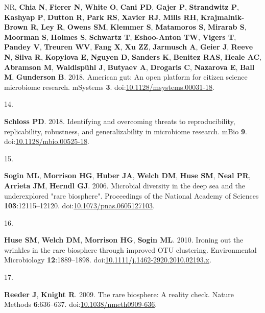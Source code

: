 \documentclass[
]{article}
\newlength{\cslhangindent}
\newlength{\csllabelwidth}
\newlength{\cslentryspacingunit} %
\newenvironment{CSLReferences}[2] %
 {%
  \setlength{\parindent}{0pt}
  \ifodd #1
  \let\oldpar\par
  \def\par{\hangindent=\cslhangindent\oldpar}
  \fi
  \setlength{\parskip}{#2\cslentryspacingunit}
 }%
 {}
\newcommand{\CSLLeftMargin}[1]{\parbox[t]{\csllabelwidth}{#1}}
\newcommand{\CSLRightInline}[1]{\parbox[t]{\linewidth - \csllabelwidth}{#1}\break}
\begin{document}
\begin{CSLReferences}{0}{1}
{{NR}, \textbf{Chia N}, \textbf{Fierer N}, \textbf{White O}, \textbf{Cani
PD}, \textbf{Gajer P}, \textbf{Strandwitz P}, \textbf{Kashyap P},
\textbf{Dutton R}, \textbf{Park RS}, \textbf{Xavier RJ}, \textbf{Mills
RH}, \textbf{Krajmalnik-Brown R}, \textbf{Ley R}, \textbf{Owens SM},
\textbf{Klemmer S}, \textbf{Matamoros S}, \textbf{Mirarab S},
\textbf{Moorman S}, \textbf{Holmes S}, \textbf{Schwartz T},
\textbf{Eshoo-Anton TW}, \textbf{Vigers T}, \textbf{Pandey V},
\textbf{Treuren WV}, \textbf{Fang X}, \textbf{Xu ZZ}, \textbf{Jarmusch
A}, \textbf{Geier J}, \textbf{Reeve N}, \textbf{Silva R},
\textbf{Kopylova E}, \textbf{Nguyen D}, \textbf{Sanders K},
\textbf{Benitez RAS}, \textbf{Heale AC}, \textbf{Abramson M},
\textbf{Waldispühl J}, \textbf{Butyaev A}, \textbf{Drogaris C},
\textbf{Nazarova E}, \textbf{Ball M}, \textbf{Gunderson B}. 2018.
American gut: An open platform for citizen science microbiome research.
{mSystems} \textbf{3}.
doi:\href{https://doi.org/10.1128/msystems.00031-18}{10.1128/msystems.00031-18}.}

\leavevmode{}%
\CSLLeftMargin{14. }%
\CSLRightInline{\textbf{Schloss PD}. 2018. Identifying and overcoming
threats to reproducibility, replicability, robustness, and
generalizability in microbiome research. {mBio} \textbf{9}.
doi:\href{https://doi.org/10.1128/mbio.00525-18}{10.1128/mbio.00525-18}.}

\leavevmode{}%
\CSLLeftMargin{15. }%
\CSLRightInline{\textbf{Sogin ML}, \textbf{Morrison HG}, \textbf{Huber
JA}, \textbf{Welch DM}, \textbf{Huse SM}, \textbf{Neal PR},
\textbf{Arrieta JM}, \textbf{Herndl GJ}. 2006. Microbial diversity in
the deep sea and the underexplored "rare biosphere". Proceedings of the
National Academy of Sciences \textbf{103}:12115--12120.
doi:\href{https://doi.org/10.1073/pnas.0605127103}{10.1073/pnas.0605127103}.}

\leavevmode{}%
\CSLLeftMargin{16. }%
\CSLRightInline{\textbf{Huse SM}, \textbf{Welch DM}, \textbf{Morrison
HG}, \textbf{Sogin ML}. 2010. Ironing out the wrinkles in the rare
biosphere through improved {OTU} clustering. Environmental Microbiology
\textbf{12}:1889--1898.
doi:\href{https://doi.org/10.1111/j.1462-2920.2010.02193.x}{10.1111/j.1462-2920.2010.02193.x}.}

\leavevmode{}%
\CSLLeftMargin{17. }%
\CSLRightInline{\textbf{Reeder J}, \textbf{Knight R}. 2009. The
{\textquotesingle}rare biosphere{\textquotesingle}: A reality check.
Nature Methods \textbf{6}:636--637.
doi:\href{https://doi.org/10.1038/nmeth0909-636}{10.1038/nmeth0909-636}.}


\end{CSLReferences}
\end{document}
